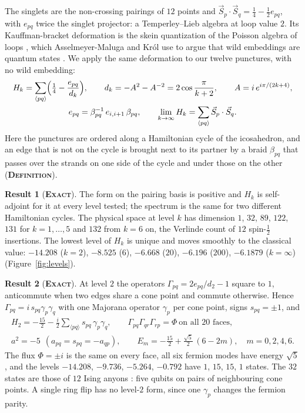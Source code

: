 \documentclass[11pt]{article}
\newcommand{\exact}{\textbf{\textsc{Exact}}}
\newcommand{\defn}{\textbf{\textsc{Definition}}}
\theoremstyle{definition}
\newtheorem{result}{Result}
\begin{document}
The singlets are the non-crossing pairings of $12$ points and $\vec S_p\cdot\vec S_q=\tfrac14-\tfrac12e_{pq}$, with $e_{pq}$ twice the singlet projector: a Temperley--Lieb algebra \cite{temperleylieb1971} at loop value $2$. Its Kauffman-bracket deformation \cite{kauffman1987} is the skein quantization of the Poisson algebra of loops \cite{turaev1991,bullock2000}, which Asselmeyer-Maluga and Kr\'ol use to argue that wild embeddings are quantum states \cite{asselmeyer2013,asselmeyer2019}. We apply the same deformation to our twelve punctures, with no wild embedding:
\begin{equation}\label{eq:levels}
\begin{gathered}
H_k=\sum_{\langle pq\rangle}\Bigl(\tfrac14-\frac{e_{pq}}{d_k}\Bigr),\qquad d_k=-A^2-A^{-2}=2\cos\frac{\pi}{k+2},\qquad A=i\,e^{i\pi/(2k+4)},\\
e_{pq}=\beta_{pq}^{-1}\,e_{i,i+1}\,\beta_{pq},\qquad \lim_{k\to\infty}H_k=\sum_{\langle pq\rangle}\vec S_p\cdot\vec S_q .
\end{gathered}
\end{equation}
Here the punctures are ordered along a Hamiltonian cycle of the icosahedron, and an edge that is not on the cycle is brought next to its partner by a braid $\beta_{pq}$ that passes over the strands on one side of the cycle and under those on the other (\defn).
\begin{result}[\exact]\label{res:levels}
The form on the pairing basis is positive and $H_k$ is self-adjoint for it at every level tested; the spectrum is the same for two different Hamiltonian cycles. The physical space at level $k$ has dimension $1$, $32$, $89$, $122$, $131$ for $k=1,\dots,5$ and $132$ from $k=6$ on, the Verlinde count \cite{verlinde1988} of $12$ spin-$\tfrac12$ insertions. The lowest level of $H_k$ is unique and moves smoothly to the classical value: $-14.208$ ($k=2$), $-8.525$ ($6$), $-6.668$ ($20$), $-6.196$ ($200$), $-6.1879$ ($k=\infty$) (Figure~\ref{fig:levels}).
\end{result}
\begin{result}[\exact]\label{res:majorana}
At level $2$ the operators $\Gamma_{pq}=2e_{pq}/d_2-1$ square to $1$, anticommute when two edges share a cone point and commute otherwise. Hence $\Gamma_{pq}=i\,s_{pq}\gamma_p\gamma_q$ with one Majorana operator $\gamma_p$ per cone point, signs $s_{pq}=\pm1$, and
\begin{equation}\label{eq:majorana}
\begin{gathered}
H_2=-\frac{15}2-\frac i2\sum_{\langle pq\rangle}s_{pq}\,\gamma_p\gamma_q,\qquad \Gamma_{pq}\Gamma_{qr}\Gamma_{rp}=\Phi\ \text{on all } 20 \text{ faces},\\
a^2=-5\ \ (a_{pq}=s_{pq}=-a_{qp}),\qquad E_m=-\frac{15}2+\frac{\sqrt5}2\,(6-2m),\quad m=0,2,4,6.
\end{gathered}
\end{equation}
The flux $\Phi=\pm i$ is the same on every face, all six fermion modes have energy $\sqrt5$, and the levels $-14.208$, $-9.736$, $-5.264$, $-0.792$ have $1$, $15$, $15$, $1$ states. The $32$ states are those of $12$ Ising anyons \cite{kitaev2006}: five qubits on pairs of neighbouring cone points. A single ring flip has no level-$2$ form, since one $\gamma_p$ changes the fermion parity.
\end{result}
\end{document}

